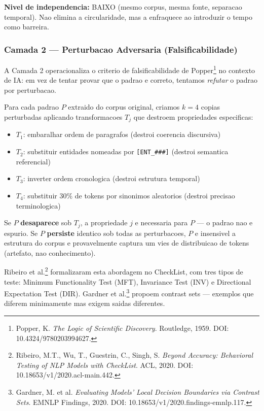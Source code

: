 \textbf{Nivel de independencia:} BAIXO (mesmo corpus, mesma fonte, separacao
temporal). Nao elimina a circularidade, mas a enfraquece ao introduzir o tempo
como barreira.

\subsubsection{Camada 2 — Perturbacao Adversaria (Falsificabilidade)}

A Camada 2 operacionaliza o criterio de falsificabilidade de
Popper\footnote{Popper, K. \textit{The Logic of Scientific Discovery}.
Routledge, 1959. DOI: 10.4324/9780203994627.} no contexto de IA: em vez de
tentar provar que o padrao e correto, tentamos \textit{refutar} o padrao por
perturbacao.

Para cada padrao $P$ extraido do corpus original, criamos $k=4$ copias
perturbadas aplicando transformacoes $T_j$ que destroem propriedades
especificas:

\begin{itemize}
\item $T_1$: embaralhar ordem de paragrafos (destroi coerencia discursiva)
\item $T_2$: substituir entidades nomeadas por \texttt{[ENT\_\#\#\#]}
      (destroi semantica referencial)
\item $T_3$: inverter ordem cronologica (destroi estrutura temporal)
\item $T_4$: substituir 30\% de tokens por sinonimos aleatorios (destroi
      precisao terminologica)
\end{itemize}

Se $P$ \textbf{desaparece} sob $T_j$, a propriedade $j$ e necessaria para $P$
— o padrao nao e espurio. Se $P$ \textbf{persiste} identico sob todas as
perturbacoes, $P$ e insensivel a estrutura do corpus e provavelmente captura
um vies de distribuicao de tokens (artefato, nao conhecimento).

Ribeiro et al.\footnote{Ribeiro, M.T., Wu, T., Guestrin, C., Singh, S.
\textit{Beyond Accuracy: Behavioral Testing of NLP Models with CheckList}. ACL,
2020. DOI: 10.18653/v1/2020.acl-main.442.} formalizaram esta abordagem no
CheckList, com tres tipos de teste: Minimum Functionality Test (MFT),
Invariance Test (INV) e Directional Expectation Test (DIR). Gardner et
al.\footnote{Gardner, M. et al. \textit{Evaluating Models' Local Decision
Boundaries via Contrast Sets}. EMNLP Findings, 2020. DOI:
10.18653/v1/2020.findings-emnlp.117.} propoem contrast sets — exemplos que
diferem minimamente mas exigem saidas diferentes.

